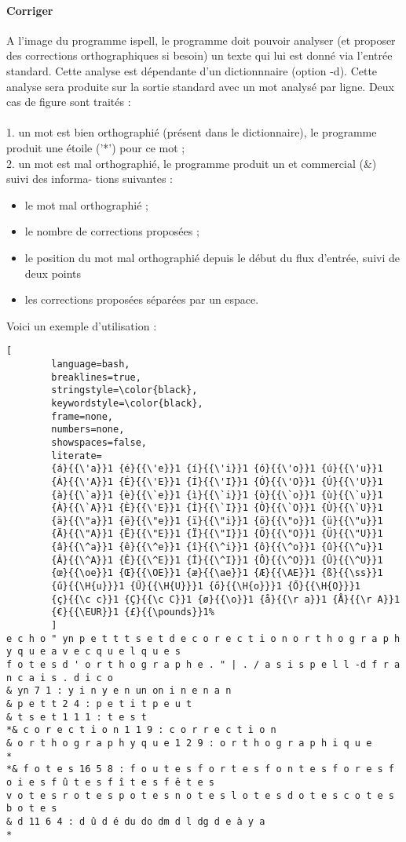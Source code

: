 \paragraph{Corriger}
A l'image du programme ispell, le programme doit pouvoir analyser (et proposer des corrections orthographiques si besoin) un texte qui lui est donné via l'entrée standard. Cette analyse est dépendante d'un dictionnnaire (option -d). Cette analyse sera produite sur la sortie standard avec un mot analysé par ligne. Deux cas de figure sont traités :\\
\\
1. un mot est bien orthographié (présent dans le dictionnaire), le programme produit une étoile ('*')
pour ce mot ;\\
2. un mot est mal orthographié, le programme produit un et commercial (\&) suivi des informa-
tions suivantes :
\begin{itemize}
	\item le mot mal orthographié ;
	\item le nombre de corrections proposées ;
	\item le position du mot mal orthographié depuis le début du flux d'entrée, suivi de deux points\\
	\item les corrections proposées séparées par un espace.
\end{itemize}
Voici un exemple d'utilisation :
\begin{lstlisting}[
		language=bash,
		breaklines=true,
		stringstyle=\color{black},
		keywordstyle=\color{black},
		frame=none,
		numbers=none,
		showspaces=false,
		literate=
		{á}{{\'a}}1 {é}{{\'e}}1 {í}{{\'i}}1 {ó}{{\'o}}1 {ú}{{\'u}}1
		{Á}{{\'A}}1 {É}{{\'E}}1 {Í}{{\'I}}1 {Ó}{{\'O}}1 {Ú}{{\'U}}1
		{à}{{\`a}}1 {è}{{\`e}}1 {ì}{{\`i}}1 {ò}{{\`o}}1 {ù}{{\`u}}1
		{À}{{\`A}}1 {È}{{\'E}}1 {Ì}{{\`I}}1 {Ò}{{\`O}}1 {Ù}{{\`U}}1
		{ä}{{\"a}}1 {ë}{{\"e}}1 {ï}{{\"i}}1 {ö}{{\"o}}1 {ü}{{\"u}}1
		{Ä}{{\"A}}1 {Ë}{{\"E}}1 {Ï}{{\"I}}1 {Ö}{{\"O}}1 {Ü}{{\"U}}1
		{â}{{\^a}}1 {ê}{{\^e}}1 {î}{{\^i}}1 {ô}{{\^o}}1 {û}{{\^u}}1
		{Â}{{\^A}}1 {Ê}{{\^E}}1 {Î}{{\^I}}1 {Ô}{{\^O}}1 {Û}{{\^U}}1
		{œ}{{\oe}}1 {Œ}{{\OE}}1 {æ}{{\ae}}1 {Æ}{{\AE}}1 {ß}{{\ss}}1
		{ű}{{\H{u}}}1 {Ű}{{\H{U}}}1 {ő}{{\H{o}}}1 {Ő}{{\H{O}}}1
		{ç}{{\c c}}1 {Ç}{{\c C}}1 {ø}{{\o}}1 {å}{{\r a}}1 {Å}{{\r A}}1
		{€}{{\EUR}}1 {£}{{\pounds}}1%
		]
e c h o " yn p e t t t s e t d e c o r e c t i o n o r t h o g r a p h y q u e a v e c q u e l q u e s
f o t e s d ' o r t h o g r a p h e . " | . / a s i s p e l l -d f r a n c a i s . d i c o
& yn 7 1 : y i n y e n un on i n e n a n
& p e t t 2 4 : p e t i t p e u t
& t s e t 1 1 1 : t e s t
*& c o r e c t i o n 1 1 9 : c o r r e c t i o n
& o r t h o g r a p h y q u e 1 2 9 : o r t h o g r a p h i q u e
*
*& f o t e s 16 5 8 : f o u t e s f o r t e s f o n t e s f o r e s f o i e s f û t e s f î t e s f ê t e s
v o t e s r o t e s p o t e s n o t e s l o t e s d o t e s c o t e s b o t e s
& d 11 6 4 : d û d é du do dm d l dg d e à y a
*
\end{lstlisting}

